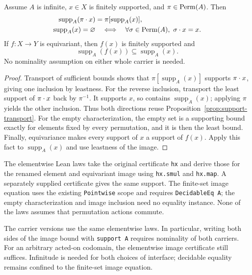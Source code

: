 \begin{proposition}
\label{prop:least-support-laws}
Assume $A$ is infinite, $x\in X$ is finitely supported, and $\pi\in\operatorname{Perm}(A)$.
Then
\begin{align*}
  \operatorname{supp}_A(\pi\mathbin{\cdot} x)&=\pi[\operatorname{supp}_A(x)],\\
  \operatorname{supp}_A(x)=\varnothing
    &\quad\Longleftrightarrow\quad
      \forall\sigma\in\operatorname{Perm}(A),\ \sigma\mathbin{\cdot} x=x.
\end{align*}
If $f:X\to Y$ is equivariant, then $f(x)$ is finitely supported and
\[
  \operatorname{supp}_A(f(x))\subseteq\operatorname{supp}_A(x).
\]
No nominality assumption on either whole carrier is needed.
\end{proposition}

\begin{proof}
Transport of sufficient bounds shows that
$\pi[\operatorname{supp}_A(x)]$ supports $\pi\mathbin{\cdot} x$, giving one inclusion
by leastness. For the reverse inclusion, transport the least support of
$\pi\mathbin{\cdot} x$ back by $\pi^{-1}$. It supports $x$, so contains
$\operatorname{supp}_A(x)$; applying $\pi$ yields the other inclusion.
Thus both directions reuse Proposition~\ref{prop:support-transport}.
For the empty characterization, the empty set is a supporting bound exactly
for elements fixed by every permutation, and it is then the least bound.
Finally, equivariance makes every support of $x$ a support of $f(x)$.
Apply this fact to $\operatorname{supp}_A(x)$ and use leastness of the image.
\end{proof}

The elementwise Lean laws take the original certificate \texttt{hx} and
derive those for the renamed element and equivariant image using
\texttt{hx.smul} and \texttt{hx.map}. A separately supplied certificate
gives the same support. The finite-set image equation uses the existing
\texttt{Pointwise} scope and requires \texttt{DecidableEq A}; the empty
characterization and image inclusion need no equality instance. None of
the laws assumes that permutation actions commute.

The carrier versions use the same elementwise laws. In particular, writing
both sides of the image bound with \texttt{support A} requires nominality of
both carriers. For an arbitrary acted-on codomain, the elementwise image
certificate still suffices. Infinitude is needed for both choices of interface;
decidable equality remains confined to the finite-set image equation.

